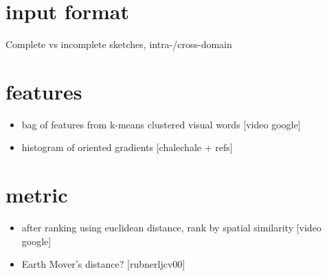 \section{input format}
Complete vs incomplete sketches, intra-/cross-domain

\section{features}

\begin{itemize}
    \item bag of features from k-means clustered visual words [video google]
    \item histogram of oriented gradients [chalechale + refs]
\end{itemize}

\section{metric}

\begin{itemize}
    \item after ranking using euclidean distance, rank by spatial similarity [video google]
    \item Earth Mover's distance? [rubnerljcv00]
\end{itemize}
